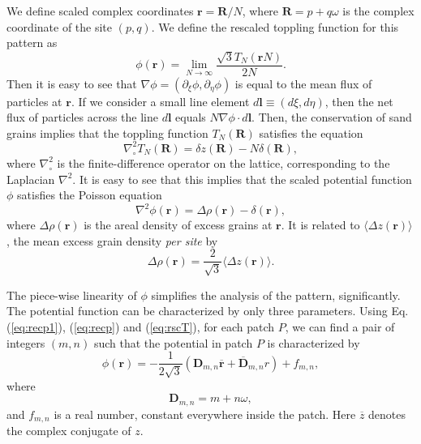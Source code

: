 \documentclass[11pt,a4paper]{book}
\begin{document}
We define scaled complex coordinates $\mathbf{r}=\mathbf{R}/N$, where
$\mathbf{R}=p+q\omega$ is the complex coordinate of the site
$\left( p,q \right)$. We define the rescaled toppling function for
this pattern as 
\begin{equation}
\phi\left( \mathbf{r} \right)=\lim_{N\rightarrow
\infty}\frac{\sqrt{3}T_{N}\left( \mathbf{r}N \right)}{2 N}.
\label{eq:rscT}
\end{equation}
Then it is easy to see that $\nabla \phi=\left( \partial_{\xi}\phi,
\partial_{\eta}\phi \right)$ is equal to the mean flux of particles at
$\mathbf{r}$. If we consider a small line element
$d\mathbf{l}\equiv\left(d\xi, d\eta\right)$, then the net flux of particles across the line
$d\mathbf{l}$ equals $N \nabla\phi\cdot d\mathbf{l}$. Then, the
conservation of sand grains implies that the toppling function
$T_{N}\left( \mathbf{R} \right)$ satisfies the equation
\begin{equation}
\nabla_{\circ}^{2}T_{N}\left( \mathbf{R} \right)=\delta z\left(
\mathbf{R}\right)-N\delta\left( \mathbf{R} \right),
\end{equation}
where $\nabla_{\circ}^{2}$ is the finite-difference operator on the
lattice, corresponding to the Laplacian $\nabla^{2}$. It is easy to
see that this implies that the scaled potential function $\phi$
satisfies the Poisson equation
\begin{equation}
\nabla^{2}\phi \left( \mathbf{r} \right)=\Delta \rho\left(
\mathbf{r}\right)-\delta\left( \mathbf{r} \right),
\end{equation}
where $\Delta\rho\left( \mathbf{r} \right)$ is the areal density of excess grains at
$\mathbf{r}$. It is related to $\langle\Delta z\left( \mathbf{r}
\right)\rangle$, the mean excess grain density {\it per site} by
\begin{equation}
\Delta \rho\left( \mathbf{r} \right)= \frac{2}{\sqrt{3}} \langle \Delta
z\left( \mathbf{r} \right)\rangle.
\end{equation}

The piece-wise linearity of $\phi$ simplifies the analysis of the pattern,
significantly. The potential function can be characterized by only
three parameters.
Using Eq. (\ref{eq:recp1}), (\ref{eq:recp}) and (\ref{eq:rscT}), for each patch
$P$, we can find a pair of integers $\left( m,n \right)$ such that the
potential in patch $P$ is characterized by
\begin{equation}
\phi\left( \mathbf{r} \right)=- \frac{1}{2\sqrt{3}}\left(
\mathbf{D}_{m,n}\overline{\mathbf{r}}+ \overline{\mathbf{D}}_{m,n}r
\right)+f_{m,n},
\end{equation}
where
\begin{equation}
\mathbf{D}_{m,n}=m+n\omega,
\label{eq:Dunn}
\end{equation}
and $f_{m,n}$ is a real number, constant everywhere inside the patch.
Here $\overline{z}$ denotes the complex conjugate of $z$.
\end{document}
